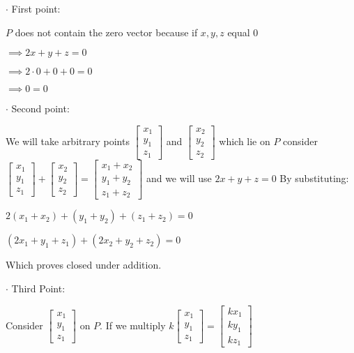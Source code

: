 \documentclass{article}
\begin{document}
{{$\cdot$ First point:

$P$ does not contain the zero vector because if $x,y,z$ equal 0

$\implies 2x+ y +z = 0 $

$\implies 2 \cdot 0 + 0 + 0 = 0$ 

$\implies 0 = 0$

$\cdot$ Second point: 

We will take arbitrary points $\begin{bmatrix} x_1 \\ y_1 \\ z_1 \end{bmatrix}$ and $\begin{bmatrix} x_2 \\ y_2 \\ z_2 \end{bmatrix}$ which lie on $P$ consider $\begin{bmatrix} x_1 \\ y_1 \\ z_1 \end{bmatrix} + \begin{bmatrix} x_2 \\ y_2 \\ z_2 \end{bmatrix} = \begin{bmatrix} x_1 + x_2 \\ y_1 + y_2 \\ z_1 + z_2 \end{bmatrix}$ and we will use $2x + y + z = 0$
By substituting: 

$2(x_1 + x_2) + (y_1 + y_2) + (z_1 + z_2) = 0$

$(2x_1 + y_1 + z_1) + (2x_2 + y_2 + z_2) = 0$

Which proves closed under addition. 

$\cdot$ Third Point:

Consider $\begin{bmatrix} x_1 \\ y_1 \\ z_1 \end{bmatrix}$ on $P$. If we multiply $k\begin{bmatrix} x_1 \\ y_1 \\ z_1 \end{bmatrix} = \begin{bmatrix} kx_1 \\ ky_1 \\ kz_1 \end{bmatrix} $ 

}}
\end{document}
